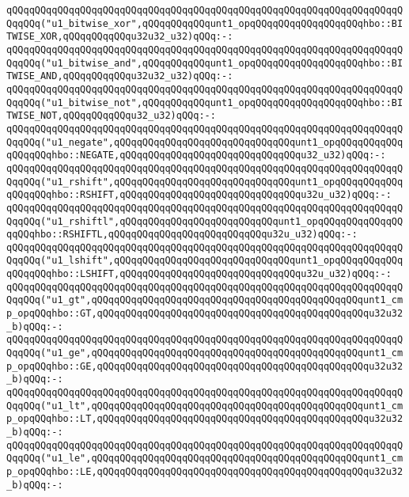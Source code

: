 \verb|qQQqqQQqqQQqqQQqqQQqqQQqqQQqqQQqqQQqqQQqqQQqqQQqqQQqqQQqqQQqqQQqqQQqqQQqqQQq("u1_bitwise_xor",qQQqqQQqqQQqunt1_opqQQqqQQqqQQqqQQqqQQqhbo::BITWISE_XOR,qQQqqQQqqQQqu32u32_u32)qQQq:-:|\newline
\verb|qQQqqQQqqQQqqQQqqQQqqQQqqQQqqQQqqQQqqQQqqQQqqQQqqQQqqQQqqQQqqQQqqQQqqQQqqQQq("u1_bitwise_and",qQQqqQQqqQQqunt1_opqQQqqQQqqQQqqQQqqQQqhbo::BITWISE_AND,qQQqqQQqqQQqu32u32_u32)qQQq:-:|\newline
\verb|qQQqqQQqqQQqqQQqqQQqqQQqqQQqqQQqqQQqqQQqqQQqqQQqqQQqqQQqqQQqqQQqqQQqqQQqqQQq("u1_bitwise_not",qQQqqQQqqQQqunt1_opqQQqqQQqqQQqqQQqqQQqhbo::BITWISE_NOT,qQQqqQQqqQQqu32_u32)qQQq:-:|\newline
\verb|qQQqqQQqqQQqqQQqqQQqqQQqqQQqqQQqqQQqqQQqqQQqqQQqqQQqqQQqqQQqqQQqqQQqqQQqqQQq("u1_negate",qQQqqQQqqQQqqQQqqQQqqQQqqQQqqQQqunt1_opqQQqqQQqqQQqqQQqqQQqhbo::NEGATE,qQQqqQQqqQQqqQQqqQQqqQQqqQQqqQQqu32_u32)qQQq:-:|\newline
\verb|qQQqqQQqqQQqqQQqqQQqqQQqqQQqqQQqqQQqqQQqqQQqqQQqqQQqqQQqqQQqqQQqqQQqqQQqqQQq("u1_rshift",qQQqqQQqqQQqqQQqqQQqqQQqqQQqqQQqunt1_opqQQqqQQqqQQqqQQqqQQqhbo::RSHIFT,qQQqqQQqqQQqqQQqqQQqqQQqqQQqqQQqu32u_u32)qQQq:-:|\newline
\verb|qQQqqQQqqQQqqQQqqQQqqQQqqQQqqQQqqQQqqQQqqQQqqQQqqQQqqQQqqQQqqQQqqQQqqQQqqQQq("u1_rshiftl",qQQqqQQqqQQqqQQqqQQqqQQqqQQqunt1_opqQQqqQQqqQQqqQQqqQQqhbo::RSHIFTL,qQQqqQQqqQQqqQQqqQQqqQQqqQQqu32u_u32)qQQq:-:|\newline
\verb|qQQqqQQqqQQqqQQqqQQqqQQqqQQqqQQqqQQqqQQqqQQqqQQqqQQqqQQqqQQqqQQqqQQqqQQqqQQq("u1_lshift",qQQqqQQqqQQqqQQqqQQqqQQqqQQqqQQqunt1_opqQQqqQQqqQQqqQQqqQQqhbo::LSHIFT,qQQqqQQqqQQqqQQqqQQqqQQqqQQqqQQqu32u_u32)qQQq:-:|\newline
\verb|qQQqqQQqqQQqqQQqqQQqqQQqqQQqqQQqqQQqqQQqqQQqqQQqqQQqqQQqqQQqqQQqqQQqqQQqqQQq("u1_gt",qQQqqQQqqQQqqQQqqQQqqQQqqQQqqQQqqQQqqQQqqQQqqQQqunt1_cmp_opqQQqhbo::GT,qQQqqQQqqQQqqQQqqQQqqQQqqQQqqQQqqQQqqQQqqQQqqQQqu32u32_b)qQQq:-:|\newline
\verb|qQQqqQQqqQQqqQQqqQQqqQQqqQQqqQQqqQQqqQQqqQQqqQQqqQQqqQQqqQQqqQQqqQQqqQQqqQQq("u1_ge",qQQqqQQqqQQqqQQqqQQqqQQqqQQqqQQqqQQqqQQqqQQqqQQqunt1_cmp_opqQQqhbo::GE,qQQqqQQqqQQqqQQqqQQqqQQqqQQqqQQqqQQqqQQqqQQqqQQqu32u32_b)qQQq:-:|\newline
\verb|qQQqqQQqqQQqqQQqqQQqqQQqqQQqqQQqqQQqqQQqqQQqqQQqqQQqqQQqqQQqqQQqqQQqqQQqqQQq("u1_lt",qQQqqQQqqQQqqQQqqQQqqQQqqQQqqQQqqQQqqQQqqQQqqQQqunt1_cmp_opqQQqhbo::LT,qQQqqQQqqQQqqQQqqQQqqQQqqQQqqQQqqQQqqQQqqQQqqQQqu32u32_b)qQQq:-:|\newline
\verb|qQQqqQQqqQQqqQQqqQQqqQQqqQQqqQQqqQQqqQQqqQQqqQQqqQQqqQQqqQQqqQQqqQQqqQQqqQQq("u1_le",qQQqqQQqqQQqqQQqqQQqqQQqqQQqqQQqqQQqqQQqqQQqqQQqunt1_cmp_opqQQqhbo::LE,qQQqqQQqqQQqqQQqqQQqqQQqqQQqqQQqqQQqqQQqqQQqqQQqu32u32_b)qQQq:-:|\newline
